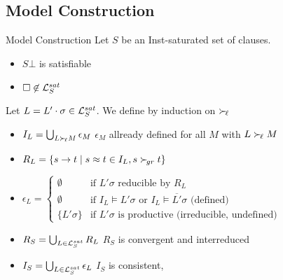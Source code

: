 \documentclass[%
handout,
]{beamer}
\begin{document}
\subsection{Model Construction}
\begin{frame}[allowframebreaks]{Model Construction}
    Let $S$ be an Inst-saturated set of clauses.
    \begin{itemize}
        \item $S\bot$ is satisfiable
        \item $\square\not\in\mathcal{L}_S^{sat}$

\end{itemize}

\vspace{1.4em}
    Let $L = L'\cdot\sigma \in\mathcal{L}_S^{sat}$.
    We define by induction on $\mathrel\succ_{\!\ell}$
        \begin{itemize}
            \item $I_L = \bigcup_{L\mathrel\succ_{\!\ell} M}\epsilon_M$
            \hfill $\epsilon_M$ allready defined for all $M$ with $L\mathrel\succ_{\!\ell} M$

            \item $R_L = \{ s \to t \mid s\approx t\in I_L, s\mathrel\succ_{\!gr} t \}$

                \item $\epsilon_L = \left\{
                    \begin{array}{cl}
                        \emptyset &\text{if }
                        L'\sigma\text{ reducible by }R_L
                        \\
                        \emptyset &\text{if }
                        I_L\vDash L'\sigma
                        \text{ or }
                        I_L\vDash \overline{L'}\sigma
                        \text{ (defined)}
                        \\
                        \{ L'\sigma \}
                        &\text{if }L'\sigma \text{ is productive (irreducible, undefined)}
                    \end{array}
                \right.$

                \framebreak
            \item
            $R_S = \bigcup_{L\in\mathcal{L}_S^{sat}} R_L$
            \hfill
            $R_S$ is convergent and interreduced

            \vspace{0.7em}
            \item
            $I_S = \bigcup_{L\in\mathcal{L}_S^{sat}} \epsilon_L$
            \hfill
            $I_S$ is consistent,


\end{itemize}
\end{frame}
\end{document}

